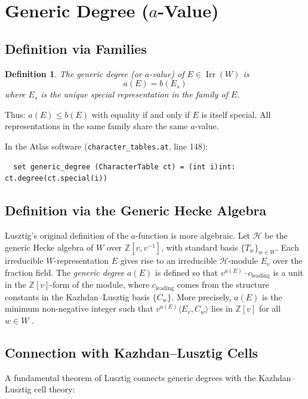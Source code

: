 \documentclass[12pt]{amsart}
\newtheorem{definition}[theorem]{Definition}
\newcommand{\Irr}{\operatorname{Irr}}
\newcommand{\ZZ}{\mathbb{Z}}
\begin{document}
\section{Generic Degree ($a$-Value)}

\subsection{Definition via Families}

\begin{definition}
  The \emph{generic degree} (or \emph{$a$-value}) of $E \in \Irr(W)$ is
  \[
    a(E) = b(E_s)
  \]
  where $E_s$ is the unique special representation in the family of $E$.
\end{definition}

Thus: $a(E) \leq b(E)$ with equality if and only if $E$ is itself special.  All
representations in the same family share the same $a$-value.

In the Atlas software (\texttt{character\_tables.at}, line 148):
\begin{verbatim}
  set generic_degree (CharacterTable ct) = (int i)int: ct.degree(ct.special(i))
\end{verbatim}

\subsection{Definition via the Generic Hecke Algebra}

Lusztig's original definition of the $a$-function is more algebraic.  Let
$\mathcal{H}$ be the generic Hecke algebra of $W$ over $\ZZ[v, v^{-1}]$, with
standard basis $\{T_w\}_{w \in W}$.  Each irreducible $W$-representation $E$
gives rise to an irreducible $\mathcal{H}$-module $E_v$ over the fraction field.
The \emph{generic degree} $a(E)$ is defined so that $v^{a(E)} \cdot
c_{\text{leading}}$ is a unit in the $\ZZ[v]$-form of the module, where
$c_{\text{leading}}$ comes from the structure constants in the Kazhdan--Lusztig
basis $\{C_w\}$.  More precisely, $a(E)$ is the minimum non-negative integer
such that $v^{a(E)} \langle E_v, C_w \rangle$ lies in $\ZZ[v]$ for all $w \in
W$ \cite[Chapter 5]{Lusztig:orange}.

\subsection{Connection with Kazhdan--Lusztig Cells}

A fundamental theorem of Lusztig \cite{Lusztig:orange} connects generic degrees
with the Kazhdan--Lusztig cell theory:
\end{document}
